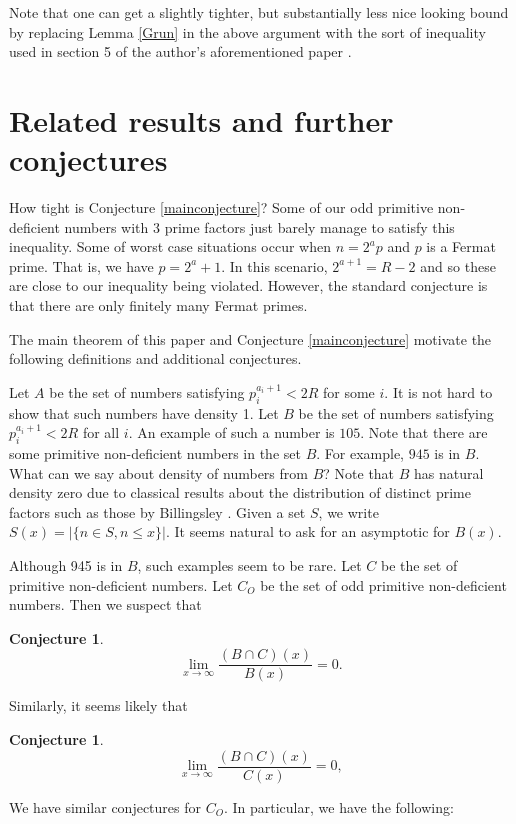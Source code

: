 \documentclass[12pt,reqno]{article}
\theoremstyle{plain}
\theoremstyle{definition}
\newtheorem{conjecture}[theorem]{Conjecture}
\theoremstyle{remark}
\begin{document}
 Note that one can get a slightly tighter, but substantially less nice looking bound by replacing Lemma \ref{Grun} in the above argument with the sort of inequality used in section 5 of the author's aforementioned paper  \cite{Zelinskybig}.

\section{Related results and further conjectures}
How tight is Conjecture \ref{mainconjecture}?  Some of our odd primitive non-deficient numbers with 3 prime factors just barely manage to satisfy this inequality. Some of worst case situations occur when $n = 2^ap$ and $p$ is a Fermat prime. That is, we have $p=2^a +1$. In this scenario, $2^{a+1} = R-2$ and so these are close to our inequality being violated. However, the standard conjecture is that there are only finitely many Fermat primes. 

The main theorem of this paper and Conjecture \ref{mainconjecture} motivate the following definitions and additional conjectures. 

Let $A$ be the set of numbers satisfying $p_i^{a_i+1}< 2R$ for some $i$. It is not hard to show that such numbers have density 1. Let $B$ be the set of numbers satisfying $p_i^{a_i+1} < 2R$ for all $i$. An example of such a number is $105$. Note that there are some primitive non-deficient  numbers in the set $B$. For example,  $945$ is in $B$. What can we say about density of numbers from $B$? Note that $B$ has natural density zero due to classical results about the distribution of distinct prime factors such as those by Billingsley \cite{Billingsley}. Given a set $S$, we write $S(x)=|\{n \in S, n \leq x\}|$. It seems natural to ask for an asymptotic for $B(x)$. 

Although 945 is in $B$, such examples seem to be rare.  Let $C$ be the set of primitive non-deficient numbers.  Let $C_O$ be the set of odd primitive non-deficient numbers. Then we suspect that
\begin{conjecture}
$$\lim_{x \rightarrow \infty} \frac{(B \cap C)(x)}{B(x)}=0.$$
\end{conjecture}
Similarly, it seems likely that
\begin{conjecture}
$$\lim_{x \rightarrow \infty} \frac{(B \cap C)(x)}{C(x)}=0,$$
\end{conjecture}

We have similar conjectures for $C_O$. In particular, we have the following:
\end{document}
